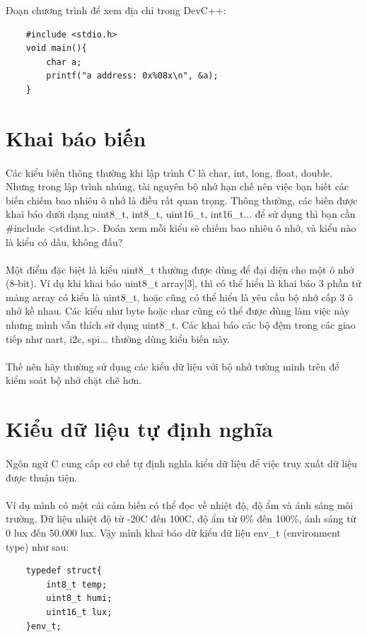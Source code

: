 \documentclass[12pt,a5paper]{book}
\begin{document}
	Đoạn chương trình để xem địa chỉ trong DevC++:\*
\begin{lstlisting}
	#include <stdio.h>
	void main(){
		char a;
		printf("a address: 0x%08x\n", &a);
	}
\end{lstlisting}

	
	\section{Khai báo biến}
	\paragraph{}
Các kiểu biến thông thường khi lập trình C là char, int, long, float, double. Nhưng trong lập trình nhúng, tài nguyên bộ nhớ hạn chế nên việc bạn biết các biến chiếm bao nhiêu ô nhớ là điều rất quan trọng. Thông thường, các biến được khai báo dưới dạng uint8\_t, int8\_t, uint16\_t, int16\_t... để sử dụng thì bạn cần  \#include <stdint.h>. Đoán xem mỗi kiểu sẽ chiếm bao nhiêu ô nhớ, và kiểu nào là kiểu có dấu, không đấu?
	\paragraph{}
	Một điểm đặc biệt là kiểu uint8\_t thường được dùng để đại diện cho một ô nhớ (8-bit). Ví dụ khi khai báo uint8\_t array[3], thì có thể hiểu là khai báo 3 phần tử mảng array có kiểu là uint8\_t, hoặc cũng có thể hiểu là yêu cầu bộ nhớ cấp 3 ô nhớ kề nhau. Các kiểu như byte hoặc char cũng có thể được dùng làm việc này nhưng mình vẫn thích sử dụng uint8\_t. Các khai báo các bộ đệm trong các giao tiếp như uart, i2c, spi... thường dùng kiểu biến này.
	\paragraph{}
	Thế nên hãy thường sử dụng các kiểu dữ liệu với bộ nhớ tường minh trên để kiểm soát bộ nhớ chặt chẽ hơn.\\
\section{Kiểu dữ liệu tự định nghĩa}
\paragraph{}
Ngôn ngữ C cung cấp cơ chế tự định nghĩa kiểu dữ liệu để việc truy xuất dữ liệu được thuận tiện.

\paragraph{}
Ví dụ mình có một cái cảm biến có thể đọc về nhiệt độ, độ ẩm và ánh sáng môi trường. Dữ liệu nhiệt độ từ  -20\textdegree{}C đến 100\textdegree{}C, độ ẩm từ 0\% đến 100\%, ánh sáng từ 0 lux đến 50.000 lux. Vậy mình khai báo dữ kiểu dữ liệu env\_t (environment type) như sau: 
\begin{lstlisting}
	typedef struct{
		int8_t temp;
		uint8_t humi;
		uint16_t lux;
	}env_t;
\end{lstlisting}
\end{document}

